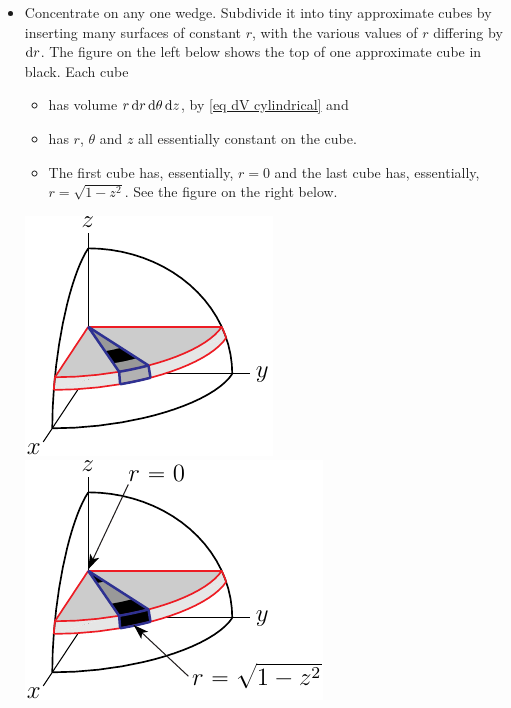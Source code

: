 \begin{eg}
\begin{itemize}
\item 
Concentrate on any one wedge. Subdivide it into tiny approximate cubes
by inserting many surfaces of constant $r$, with the various values of $r$ differing by $\mathrm{d}r$. The figure on the left below shows the top of one 
approximate cube in black. Each cube 
\vspace{-\topsep}
\begin{itemize} \itemsep1pt \parskip0pt 
\item
has volume $r\,\mathrm{d}r\,\mathrm{d}\theta\,\mathrm{d}z$, by \eqref{eq dV cylindrical}
and 
\item
has $r$, $\theta$ and $z$ all essentially constant on the cube.
\item The first cube has, essentially, $r=0$ and the last cube has,
essentially, $r=\sqrt{1-z^2}$.  See the figure on the right below.
\end{itemize}
\vspace{-\topsep}
\begin{efig}
\begin{center}
    \includegraphics{sphereCyl3a.pdf}\qquad\qquad
    \includegraphics{sphereCyl3b.pdf}
\end{center}
\end{efig}
\end{itemize}


\end{eg}
